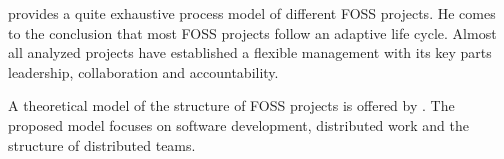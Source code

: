 \textcite{Johnson2001} provides a quite exhaustive process model of different
\ac{FOSS} projects. He comes to the conclusion that most \ac{FOSS} projects
follow an adaptive life cycle. Almost all analyzed projects have established a
flexible management with its key parts leadership, collaboration and
accountability.

A theoretical model of the structure of \ac{FOSS} projects is offered by
\textcite{Crowston2005}. The proposed model focuses on software development,
distributed work and the structure of distributed teams.


